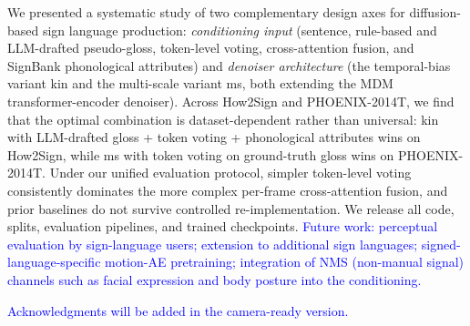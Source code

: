 \documentclass{article}
\newcommand{\placeholder}[1]{\textcolor{blue}{#1}}
\begin{document}
We presented a systematic study of two complementary design axes for diffusion-based sign language production: \emph{conditioning input} (sentence, rule-based and LLM-drafted pseudo-gloss, token-level voting, cross-attention fusion, and SignBank phonological attributes) and \emph{denoiser architecture} (the temporal-bias variant kin and the multi-scale variant ms, both extending the MDM transformer-encoder denoiser). Across How2Sign and PHOENIX-2014T, we find that the optimal combination is dataset-dependent rather than universal: kin with LLM-drafted gloss + token voting + phonological attributes wins on How2Sign, while ms with token voting on ground-truth gloss wins on PHOENIX-2014T. Under our unified evaluation protocol, simpler token-level voting consistently dominates the more complex per-frame cross-attention fusion, and prior baselines do not survive controlled re-implementation. We release all code, splits, evaluation pipelines, and trained checkpoints.
\placeholder{Future work: perceptual evaluation by sign-language users; extension to additional sign languages; signed-language-specific motion-AE pretraining; integration of NMS (non-manual signal) channels such as facial expression and body posture into the conditioning.}


\begin{ack}
\placeholder{Acknowledgments will be added in the camera-ready version.}
\end{ack}


\end{document}
